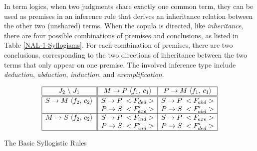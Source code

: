 In term logics, when two judgments share exactly one common term, they can be used as premises in an inference rule that derives an inheritance relation between the other two (unshared) terms.  When the copula is directed, like \emph{inheritance}, there are four possible combinations of premises and conclusions, as listed in Table \ref{NAL-1-Syllogisms}. For each combination of premises, there are two conclusions, corresponding to the two directions of inheritance between the two terms that only appear on one premise. The involved inference type include \emph{deduction}, \emph{abduction}, \emph{induction}, and \emph{exemplification}.

\begin{table}[htb]
\[\begin{array}{|c||c|c|} \hline
J_2 \; \backslash \; J_1
        & M \rightarrow P \; \langle f_1, \, c_1\rangle       & P \rightarrow M \; \langle f_1, \, c_1\rangle \\
\hline \hline
S \rightarrow M \; \langle f_2, \, c_2\rangle  & S \rightarrow P \; <F_{ded}>  & S \rightarrow P \; <F_{abd}>  \\
                                     & P \rightarrow S \; <F'_{exe}>  & P \rightarrow S \; <F'_{abd}>  \\
\hline
M \rightarrow S \; \langle f_2, \, c_2\rangle  & S \rightarrow P \; <F_{ind}>  & S \rightarrow P \; <F_{exe}>  \\
                                     & P \rightarrow S \; <F'_{ind}>  & P \rightarrow S \; <F'_{ded}>  \\
\hline \end{array}\]
\caption{The Basic Syllogistic Rules}
\label{NAL-1-Syllogisms}
\end{table}

